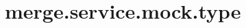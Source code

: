 \section{merge.service.mock.type}
\label{configuration:MergeServiceMockType}
\AvailableInCsharpOnly{\TODO}